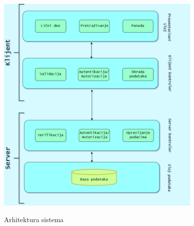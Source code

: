 \documentclass[20pt]{article}
\begin{document}
\newpage
\begin{figure}[h]
        \centering
        \includegraphics[width=0.9\textwidth,height=0.74\textheight]{Pictures/Arhitektura3.png}\\
        \caption{Arhitektura sistema}
        \label{fig:arhitekturaSistema}
\end{figure}

      
\end{document}

